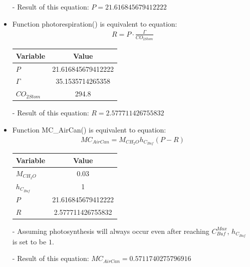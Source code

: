 \documentclass[a4paper]{article}
\begin{document}
\begin{itemize}
  \item[-] Result of this equation: \(P = 21.616845679412222\)

  \item Function photorespiration() is equivalent to equation:
        \begin{align*}
          R = P \cdot \frac{\Gamma}{CO_{2Stom}}
        \end{align*}

        \begin{table}[H]
          \centering
          \begin{tabular}{@{}lS[table-format=3.15]@{}}
            \toprule
            \textbf{Variable} & \textbf{Value}     \\
            \midrule
            \(P\)             & 21.616845679412222 \\
            \(\Gamma\)        & 35.1535714265358   \\
            \(CO_{2Stom}\)    & 294.8              \\
            \bottomrule
          \end{tabular}
        \end{table}

  \item[-] Result of this equation: \(R = 2.577711426755832\)

  \item Function MC\_AirCan() is equivalent to equation:
        \begin{align*}
          MC_{AirCan} = M_{CH_2O} h_{C_{Buf}} (P - R)
        \end{align*}

        \begin{table}[H]
          \centering
          \begin{tabular}{@{}lS[table-format=3.15]@{}}
            \toprule
            \textbf{Variable} & \textbf{Value}     \\
            \midrule
            \(M_{CH_2O}\)     & 0.03               \\
            \(h_{C_{Buf}}\)   & 1                  \\
            \(P\)             & 21.616845679412222 \\
            \(R\)             & 2.577711426755832  \\
            \bottomrule
          \end{tabular}
        \end{table}
  \item[-] Assuming photosynthesis will always occur even after reaching \(C^{Max}_{Buf}\), \(h_{C_{Buf}}\) is set to be \(1\).
  \item[-] Result of this equation: \(MC_{AirCan} = 0.5711740275796916\)


\end{itemize}
\end{document}
